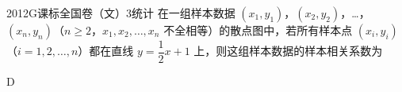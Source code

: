 
\begin{problem}{2012}{G}{课标全国卷（文）}{3}{统计}
在一组样本数据 $ (x_1,y_1) $，$ (x_2,y_2) $，…，$ (x_n,y_n) $（$ n\geq 2 $，$ x_1,x_2,\dots,x_n $ 不全相等）的散点图中，若所有样本点 $ (x_i,y_i) $（$ i=1,2,\dots,n $）都在直线 $ y=\dfrac{1}{2}x+1 $ 上，则这组样本数据的样本相关系数为
\begin{choices}
\end{choices}
\end{problem}

\begin{answer}
D
\end{answer}

\begin{solutions}

\end{solutions}
